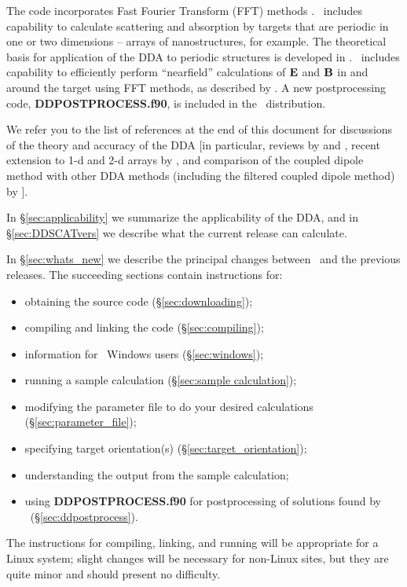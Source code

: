 The code incorporates Fast Fourier Transform (FFT) methods
\citep{Goodman+Draine+Flatau_1990}.
\ddscatv\ includes capability to calculate scattering and absorption
by targets that are periodic in one or two dimensions -- arrays of
nanostructures, for example.
The theoretical basis for application of the DDA to periodic structures
is developed in \citet{Draine+Flatau_2008a}.
\ddscatseventhree\ includes capability to efficiently perform 
``nearfield'' calculations of ${\bf E}$ and ${\bf B}$ in and around the target using
FFT methods, as described by \citet{Flatau+Draine_2012}.
A new postprocessing code, {\bf DDPOSTPROCESS.f90}, is included in the
\ddscatv\ distribution.

We refer you to the list of references at the end of this document for 
discussions
of the theory and accuracy of the DDA [in particular,
reviews by \citet{Draine+Flatau_1994} and \citet{Draine_2000a},
recent extension to 1-d and 2-d arrays by \citet{Draine+Flatau_2008a},
and comparison of the coupled dipole method with other DDA methods
(including the filtered coupled dipole method)
by \citet{Yurkin+Min+Hoekstra_2010}].

In \S\ref{sec:applicability} we summarize the applicability of the DDA, and 
in \S\ref{sec:DDSCATvers} we describe what the current release can calculate.

In \S\ref{sec:whats_new} we 
describe the principal changes between \ddscatv\ and the previous 
releases.  The succeeding sections contain instructions for:
\begin{itemize}
\item obtaining the source code (\S\ref{sec:downloading});
\item compiling and linking the code (\S\ref{sec:compiling});
\item information for \Microsoft\ Windows users (\S\ref{sec:windows});
\item running a sample calculation (\S\ref{sec:sample calculation});
\item modifying the parameter file to do your desired calculations
(\S\ref{sec:parameter_file});
\item specifying target orientation(s) (\S\ref{sec:target_orientation});
\item understanding the output from the sample calculation;
\item using {\bf DDPOSTPROCESS.f90} for postprocessing of solutions found
      by \ddscatv\
      (\S\ref{sec:ddpostprocess}).
\end{itemize}
The instructions for compiling, linking, and running will be appropriate for a
Linux system; slight changes will be necessary for non-Linux sites, 
but they are quite minor and should present no difficulty.

